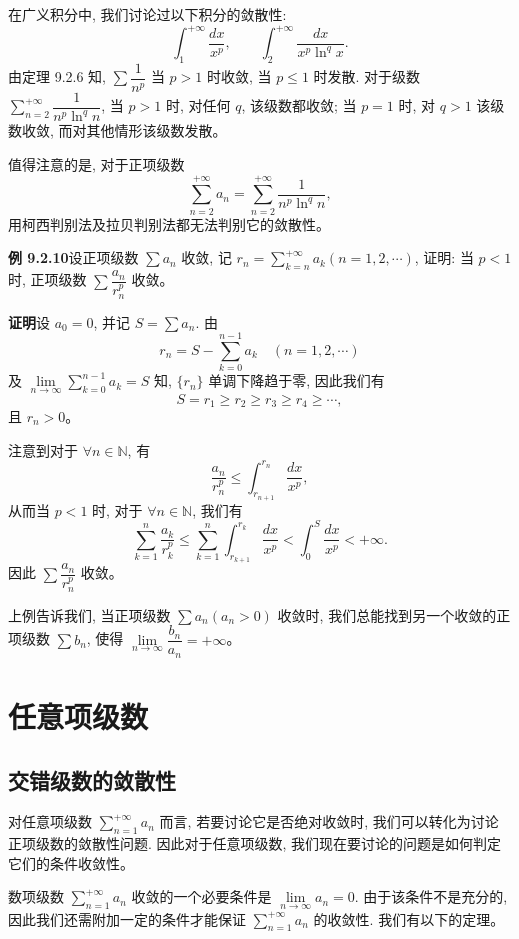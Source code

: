 \documentclass[UTF8,12pt,a4paper,fontset=fandol]{ctexart}
\begin{document}
在广义积分中, 我们讨论过以下积分的敛散性:
\[
  \int_1^{+\infty}\frac{dx}{x^p},\qquad
  \int_2^{+\infty}\frac{dx}{x^p\ln^q x}.
\]
由定理 9.2.6 知, $\sum\dfrac1{n^p}$ 当 $p>1$ 时收敛, 当 $p\leq1$ 时发散. 对于级数 $\sum\limits_{n=2}^{+\infty}\dfrac1{n^p\ln^q n}$, 当 $p>1$ 时, 对任何 $q$, 该级数都收敛; 当 $p=1$ 时, 对 $q>1$ 该级数收敛, 而对其他情形该级数发散。

值得注意的是, 对于正项级数
\[
  \sum_{n=2}^{+\infty}a_n=\sum_{n=2}^{+\infty}\frac1{n^p\ln^q n},
\]
用柯西判别法及拉贝判别法都无法判别它的敛散性。

\noindent\textbf{例 9.2.10}\quad 设正项级数 $\sum a_n$ 收敛, 记 $r_n=\sum\limits_{k=n}^{+\infty}a_k(n=1,2,\cdots)$, 证明: 当 $p<1$ 时, 正项级数 $\sum\dfrac{a_n}{r_n^p}$ 收敛。

\noindent\textbf{证明}\quad 设 $a_0=0$, 并记 $S=\sum a_n$. 由
\[
  r_n=S-\sum_{k=0}^{n-1}a_k\quad(n=1,2,\cdots)
\]
及 $\lim\limits_{n\to\infty}\sum\limits_{k=0}^{n-1}a_k=S$ 知, $\{r_n\}$ 单调下降趋于零, 因此我们有
\[
  S=r_1\geq r_2\geq r_3\geq r_4\geq\cdots,
\]
且 $r_n>0$。

注意到对于 $\forall n\in\mathbb{N}$, 有
\[
  \frac{a_n}{r_n^p}\leq\int_{r_{n+1}}^{r_n}\frac{dx}{x^p},
\]
从而当 $p<1$ 时, 对于 $\forall n\in\mathbb{N}$, 我们有
\[
  \sum_{k=1}^n\frac{a_k}{r_k^p}
  \leq\sum_{k=1}^n\int_{r_{k+1}}^{r_k}\frac{dx}{x^p}
  <\int_0^S\frac{dx}{x^p}<+\infty.
\]
因此 $\sum\dfrac{a_n}{r_n^p}$ 收敛。

上例告诉我们, 当正项级数 $\sum a_n(a_n>0)$ 收敛时, 我们总能找到另一个收敛的正项级数 $\sum b_n$, 使得 $\lim\limits_{n\to\infty}\dfrac{b_n}{a_n}=+\infty$。

\section{任意项级数}

\subsection{交错级数的敛散性}

对任意项级数 $\sum\limits_{n=1}^{+\infty}a_n$ 而言, 若要讨论它是否绝对收敛时, 我们可以转化为讨论正项级数的敛散性问题. 因此对于任意项级数, 我们现在要讨论的问题是如何判定它们的条件收敛性。

数项级数 $\sum\limits_{n=1}^{+\infty}a_n$ 收敛的一个必要条件是 $\lim\limits_{n\to\infty}a_n=0$. 由于该条件不是充分的, 因此我们还需附加一定的条件才能保证 $\sum\limits_{n=1}^{+\infty}a_n$ 的收敛性. 我们有以下的定理。
\end{document}
